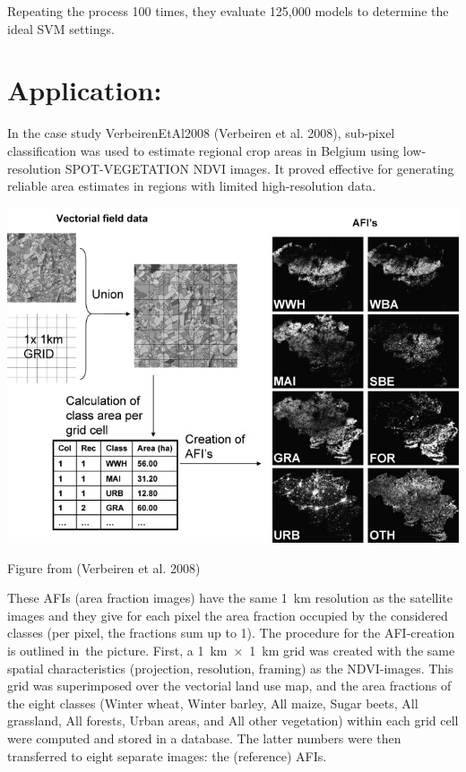 \documentclass[
  letterpaper,
  DIV=11,
  numbers=noendperiod]{scrreprt}
\begin{document}
Repeating the process 100 times, they evaluate 125,000 models to
determine the ideal SVM settings.

\section{Application:}\label{application-6}

In the case study VerbeirenEtAl2008 (Verbeiren et al. 2008), sub-pixel
classification was used to estimate regional crop areas in Belgium using
low-resolution SPOT-VEGETATION NDVI images. It proved effective for
generating reliable area estimates in regions with limited
high-resolution data.

\includegraphics{sub-pixel.png}

Figure from (Verbeiren et al. 2008)

These AFIs (area fraction images) have the same 1~km resolution as the
satellite images and they give for each pixel the area fraction occupied
by the considered classes (per pixel, the fractions sum up to 1). The
procedure for the AFI-creation is outlined in~the picture. First, a
1~km~×~1~km grid was created with the same spatial characteristics
(projection, resolution, framing) as the NDVI-images. This grid was
superimposed over the vectorial land use map, and the area fractions of
the eight classes (Winter wheat, Winter barley, All maize, Sugar beets,
All grassland, All forests, Urban areas, and All other vegetation)
within each grid cell were computed and stored in a database. The latter
numbers were then transferred to eight separate images: the (reference)
AFIs.
\end{document}
